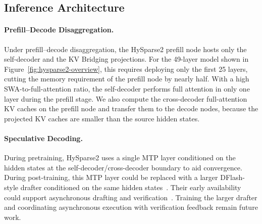 \subsection{Inference Architecture}
\label{sec:prefill-decode}

\paragraph{Prefill–Decode Disaggregation.}

Under prefill--decode disaggregation, the HySparse2 prefill node hosts only the self-decoder and the KV Bridging projections.
For the 49-layer model shown in Figure~\ref{fig:hysparse2-overview}, this requires deploying only the first 25 layers, cutting the memory requirement of the prefill node by nearly half.
With a high SWA-to-full-attention ratio, the self-decoder performs full attention in only one layer during the prefill stage.
We also compute the cross-decoder full-attention KV caches on the prefill node and transfer them to the decode nodes, because the projected KV caches are smaller than the source hidden states.

\paragraph{Speculative Decoding.}

During pretraining, HySparse2 uses a single MTP layer conditioned on the hidden states at the self-decoder/cross-decoder boundary to aid convergence.
During post-training, this MTP layer could be replaced with a larger DFlash-style drafter conditioned on the same hidden states~\citep{chen2026dflash}.
Their early availability could support asynchronous drafting and verification~\citep{zhang2025swiftspec}.
Training the larger drafter and coordinating asynchronous execution with verification feedback remain future work.

